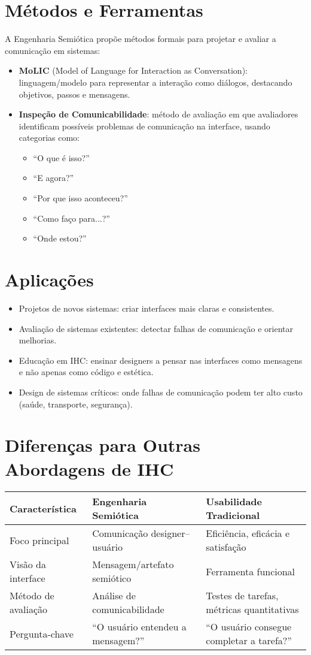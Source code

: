 \documentclass[12pt,a4paper]{article}
\begin{document}
\section{Métodos e Ferramentas}
A Engenharia Semiótica propõe métodos formais para projetar e avaliar a comunicação em sistemas:
\begin{itemize}
    \item \textbf{MoLIC} (Model of Language for Interaction as Conversation): linguagem/modelo para representar a interação como diálogos, destacando objetivos, passos e mensagens.
    \item \textbf{Inspeção de Comunicabilidade}: método de avaliação em que avaliadores identificam possíveis problemas de comunicação na interface, usando categorias como:
    \begin{itemize}
        \item ``O que é isso?''
        \item ``E agora?''
        \item ``Por que isso aconteceu?''
        \item ``Como faço para...?''
        \item ``Onde estou?''
    \end{itemize}
\end{itemize}

\section{Aplicações}
\begin{itemize}
    \item Projetos de novos sistemas: criar interfaces mais claras e consistentes.
    \item Avaliação de sistemas existentes: detectar falhas de comunicação e orientar melhorias.
    \item Educação em IHC: ensinar designers a pensar nas interfaces como mensagens e não apenas como código e estética.
    \item Design de sistemas críticos: onde falhas de comunicação podem ter alto custo (saúde, transporte, segurança).
\end{itemize}

\section{Diferenças para Outras Abordagens de IHC}
\begin{longtable}{|p{4cm}|p{5cm}|p{5cm}|}
\hline
\textbf{Característica} & \textbf{Engenharia Semiótica} & \textbf{Usabilidade Tradicional} \\
\hline
Foco principal & Comunicação designer–usuário & Eficiência, eficácia e satisfação \\
\hline
Visão da interface & Mensagem/artefato semiótico & Ferramenta funcional \\
\hline
Método de avaliação & Análise de comunicabilidade & Testes de tarefas, métricas quantitativas \\
\hline
Pergunta-chave & ``O usuário entendeu a mensagem?'' & ``O usuário consegue completar a tarefa?'' \\
\hline
\end{longtable}
\end{document}
